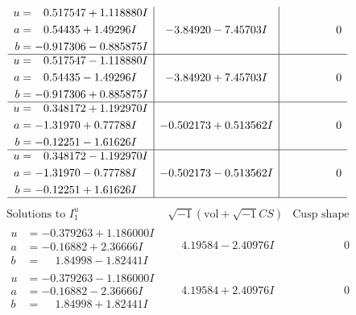 \documentclass[1p]{elsarticle_modified}
\theoremstyle{definition}
\newcommand{\I}{\sqrt{-1}}
\begin{document}
$$\begin{array}{c|c|c}
\begin{aligned}
u &= \phantom{-}0.517547 + 1.118880 I \\
a &= \phantom{-}0.54435 + 1.49296 I \\
b &= -0.917306 - 0.885875 I\end{aligned}
 & -3.84920 - 7.45703 I & \phantom{-0.000000 } 0 \\ \hline\begin{aligned}
u &= \phantom{-}0.517547 - 1.118880 I \\
a &= \phantom{-}0.54435 - 1.49296 I \\
b &= -0.917306 + 0.885875 I\end{aligned}
 & -3.84920 + 7.45703 I & \phantom{-0.000000 } 0 \\ \hline\begin{aligned}
u &= \phantom{-}0.348172 + 1.192970 I \\
a &= -1.31970 + 0.77788 I \\
b &= -0.12251 - 1.61626 I\end{aligned}
 & -0.502173 + 0.513562 I & \phantom{-0.000000 } 0 \\ \hline\begin{aligned}
u &= \phantom{-}0.348172 - 1.192970 I \\
a &= -1.31970 - 0.77788 I \\
b &= -0.12251 + 1.61626 I\end{aligned}
 & -0.502173 - 0.513562 I & \phantom{-0.000000 } 0\\
 \hline 
 \end{array}$$\newpage$$\begin{array}{c|c|c}  
\text{Solutions to }I^u_{1}& \I (\text{vol} + \sqrt{-1}CS) & \text{Cusp shape}\\
 \hline 
\begin{aligned}
u &= -0.379263 + 1.186000 I \\
a &= -0.16882 + 2.36666 I \\
b &= \phantom{-}1.84998 - 1.82441 I\end{aligned}
 & \phantom{-}4.19584 - 2.40976 I & \phantom{-0.000000 } 0 \\ \hline\begin{aligned}
u &= -0.379263 - 1.186000 I \\
a &= -0.16882 - 2.36666 I \\
b &= \phantom{-}1.84998 + 1.82441 I\end{aligned}
 & \phantom{-}4.19584 + 2.40976 I & \phantom{-0.000000 } 0 \\ \hline\begin{aligned}

\end{aligned}
\end{array}$$
\end{document}
